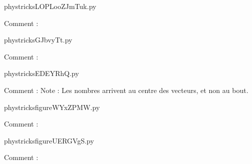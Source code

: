 
    \newcommand{\CaptionFigLOPLooZJmTuk}{<+Type your caption here+>}
    \begin{center}
        
    \end{center}
    phystricksLOPLooZJmTuk.py

    Comment : 

    \clearpage
    


    \newcommand{\CaptionFigGJbvyTt}{<+Type your caption here+>}
    \begin{center}
        
    \end{center}
    phystricksGJbvyTt.py

    Comment : 

    \clearpage
    


    \newcommand{\CaptionFigEDEYRhQ}{<+Type your caption here+>}
    \begin{center}
        
    \end{center}
    phystricksEDEYRhQ.py

    Comment : Note : Les nombres arrivent au centre des vecteurs, et non au bout.

    \clearpage
    


    \newcommand{\CaptionFigfigureWYxZPMW}{<+Type your caption here+>}
    \begin{center}
        
    \end{center}
    phystricksfigureWYxZPMW.py

    Comment : 

    \clearpage
    


    \newcommand{\CaptionFigfigureUERGVgS}{<+Type your caption here+>}
    \begin{center}
        
    \end{center}
    phystricksfigureUERGVgS.py

    Comment : 

    \clearpage
    


